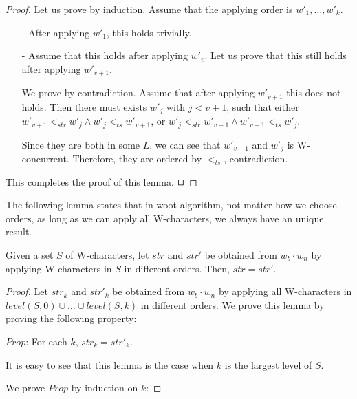{\begin {proof}

Let us prove by induction. Assume that the applying order is $w'_1,\ldots,w'_k$.

\begin{itemize}
\setlength{\itemsep}{0.5pt}
\item[-] After applying $w'_1$, this holds trivially.

\item[-] Assume that this holds after applying $w'_v$. Let us prove that this still holds after applying $w'_{v+1}$.

We prove by contradiction. Assume that after applying $w'_{v+1}$ this does not holds. Then there must exists $w'_j$ with $j < v+1$, such that either $w'_{v+1} <_{\mathit{str}} w'_j \wedge w'_j <_{\mathit{ts}} w'_{v+1}$, or $w'_j <_{\mathit{str}} w'_{v+1} \wedge w'_{v+1} <_{\mathit{ts}} w'_j$.

Since they are both in some $L$, we can see that $w'_{v+1}$ and $w'_j$ is W-concurrent. Therefore, they are ordered by $<_{\mathit{ts}}$, contradiction.
\end{itemize}

This completes the proof of this lemma. $\qed$
\end {proof}

The following lemma states that in woot algorithm, not matter how we choose orders, as long as we can apply all W-characters, we always have an unique result.

\begin{lemma}
\label{lemma:all possible L of insert are ordered by time stamp}
Given a set $S$ of W-characters, let $\textit{str}$ and $\textit{str}'$ be obtained from $w_b \cdot w_n$ by applying W-characters in $S$ in different orders. Then, $\mathit{str} = \mathit{str}'$.
\end{lemma}

\begin {proof}

Let $\textit{str}_k$ and $\textit{str}'_k$ be obtained from $w_b \cdot w_n$ by applying all W-characters in $\mathit{level}(S,0) \cup \ldots \cup \mathit{level}(S,k)$ in different orders. We prove this lemma by proving the following property:

$\mathit{Prop}$: For each $k$, $\textit{str}_k = \textit{str}'_k$.

It is easy to see that this lemma is the case when $k$ is the largest level of $S$.

We prove $\mathit{Prop}$ by induction on $k$:


\end{proof}}
